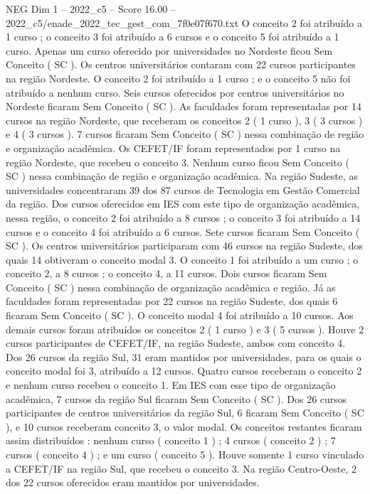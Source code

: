 \begin{textsample}{NEG Dim 1 – 2022\_c5 – Score 16.00 – 2022\_c5/enade\_2022\_tec\_gest\_com\_7f0e07f670.txt}
O conceito 2 foi atribuído a 1 curso ; o conceito 3 foi atribuído a 6 cursos e o conceito 5 foi atribuído a 1 curso.
Apenas um curso oferecido por universidades no Nordeste ficou Sem Conceito ( SC ).
Os centros universitários contaram com 22 cursos participantes na região Nordeste.
O conceito 2 foi atribuído a 1 curso ; e o conceito 5 não foi atribuído a nenhum curso.
Seis cursos oferecidos por centros universitários no Nordeste ficaram Sem Conceito ( SC ).
As faculdades foram representadas por 14 cursos na região Nordeste, que receberam os conceitos 2 ( 1 curso ), 3 ( 3 cursos ) e 4 ( 3 cursos ). 7 cursos ficaram Sem Conceito ( SC ) nessa combinação de região e organização acadêmica.
Os CEFET/IF foram representados por 1 curso na região Nordeste, que recebeu o conceito 3.
Nenhum curso ficou Sem Conceito ( SC ) nessa combinação de região e organização acadêmica.
Na região Sudeste, as universidades concentraram 39 dos 87 cursos de Tecnologia em Gestão Comercial da região.
Dos cursos oferecidos em IES com este tipo de organização acadêmica, nessa região, o conceito 2 foi atribuído a 8 cursos ; o conceito 3 foi atribuído a 14 cursos e o conceito 4 foi atribuído a 6 cursos.
Sete cursos ficaram Sem Conceito ( SC ).
Os centros universitários participaram com 46 cursos na região Sudeste, dos quais 14 obtiveram o conceito modal 3.
O conceito 1 foi atribuído a um curso ; o conceito 2, a 8 cursos ; o conceito 4, a 11 cursos.
Dois cursos ficaram Sem Conceito ( SC ) nessa combinação de organização acadêmica e região.
Já as faculdades foram representadas por 22 cursos na região Sudeste, dos quais 6 ficaram Sem Conceito ( SC ).
O conceito modal 4 foi atribuído a 10 cursos.
Aos demais cursos foram atribuídos os conceitos 2 ( 1 curso ) e 3 ( 5 cursos ).
Houve 2 cursos participantes de CEFET/IF, na região Sudeste, ambos com conceito 4.
Dos 26 cursos da região Sul, 31 eram mantidos por universidades, para os quais o conceito modal foi 3, atribuído a 12 cursos.
Quatro cursos receberam o conceito 2 e nenhum curso recebeu o conceito 1.
Em IES com esse tipo de organização acadêmica, 7 cursos da região Sul ficaram Sem Conceito ( SC ).
Dos 26 cursos participantes de centros universitários da região Sul, 6 ficaram Sem Conceito ( SC ), e 10 cursos receberam conceito 3, o valor modal.
Os conceitos restantes ficaram assim distribuídos : nenhum curso ( conceito 1 ) ; 4 cursos ( conceito 2 ) ; 7 cursos ( conceito 4 ) ; e um curso ( conceito 5 ).
Houve somente 1 curso vinculado a CEFET/IF na região Sul, que recebeu o conceito 3.
Na região Centro-Oeste, 2 dos 22 cursos oferecidos eram mantidos por universidades.

\end{textsample}
